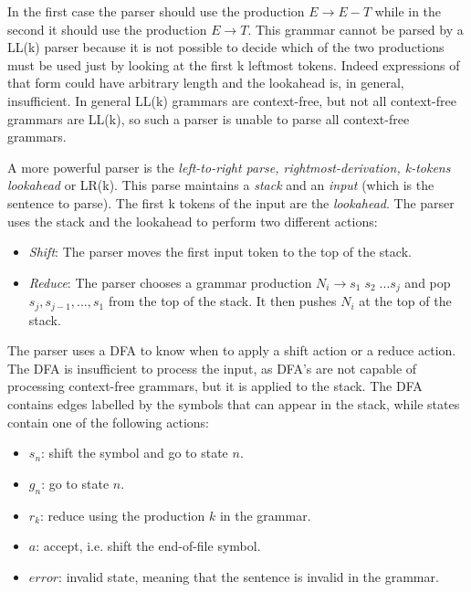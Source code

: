 \noindent
In the first case the parser should use the production $E \rightarrow E - T$ while in the second it should use the production $E \rightarrow T$. This grammar cannot be parsed by a LL(k) parser because it is not possible to decide which of the two productions must be used just by looking at the first k leftmost tokens. Indeed expressions of that form could have arbitrary length and the lookahead is, in general, insufficient. In general LL(k) grammars are context-free, but not all context-free grammars are LL(k), so such a parser is unable to parse all context-free grammars.

A more powerful parser is the \textit{left-to-right parse, rightmost-derivation, k-tokens lookahead} or LR(k). This parse maintains a \textit{stack} and an \textit{input} (which is the sentence to parse). The first k tokens of the input are the \textit{lookahead}. The parser uses the stack and the lookahead to perform two different actions:

\begin{itemize}
	\item \textit{Shift}: The parser moves the first input token to the top of the stack.
	\item \textit{Reduce}: The parser chooses a grammar production $N_{i} \rightarrow s_{1} \; s_{2} \; ... s_{j}$ and pop $s_{j}, s_{j - 1}, ... , s_{1}$ from the top of the stack. It then pushes $N_{i}$ at the top of the stack.
\end{itemize}

\noindent
The parser uses a DFA to know when to apply a shift action or a reduce action. The DFA is insufficient to process the input, as DFA's are not capable of processing context-free grammars, but it is applied to the stack. The DFA contains edges labelled by the symbols that can appear in the stack, while states contain one of the following actions:

\begin{itemize}[noitemsep]
	\item $s_{n}$: shift the symbol and go to state $n$.
	\item $g_{n}$: go to state $n$.
	\item $r_{k}$: reduce using the production $k$ in the grammar.
	\item $a$: accept, i.e. shift the end-of-file symbol.
	\item $error$: invalid state, meaning that the sentence is invalid in the grammar.
\end{itemize}

